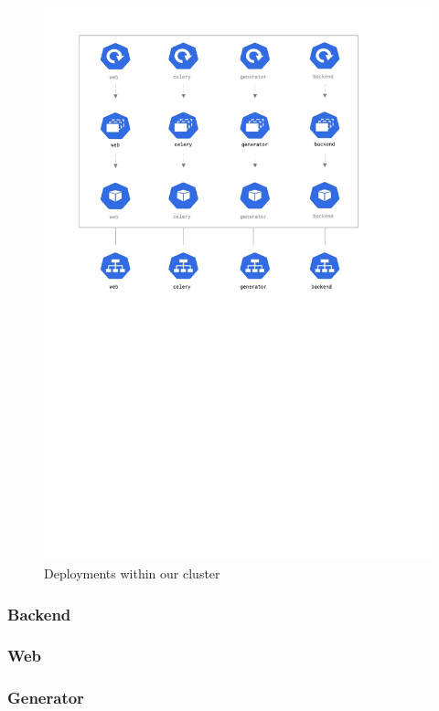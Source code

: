 \documentclass[thesis=B,english]{FITthesis}[2019/12/23]
\begin{document}
\begin{figure}[H]
\centering
\caption{Deployments within our cluster}
\hspace*{-2cm}
\includegraphics[scale=0.5]{deployment-diagram}
\end{figure}

\subsubsection{Backend}

\subsubsection{Web}

\subsubsection{Generator}
\end{document}
